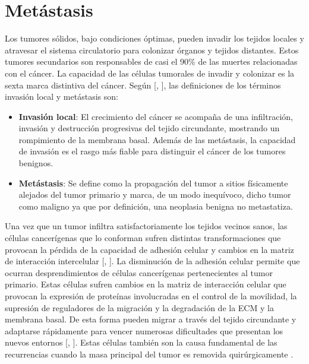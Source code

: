 \section{Metástasis}
\hspace{.1cm}Los tumores sólidos, bajo condiciones óptimas, pueden invadir los tejidos locales y atravesar el sistema circulatorio para colonizar órganos y tejidos distantes. Estos tumores secundarios son responsables de casi el 90\% de las muertes relacionadas con el cáncer. La capacidad de las células tumorales de invadir y colonizar es la sexta marca distintiva del cáncer. Según [\cite{robins}, \cite{hanahan}], las definiciones de los términos invasión local y metástasis son:
\begin{itemize}
    \item \textbf{Invasión local}: El crecimiento del cáncer se acompaña de una infiltración, invasión y destrucción progresivas del tejido circundante, mostrando un rompimiento de la membrana basal. Además de las metástasis, la capacidad de invasión es el rasgo más fiable para distinguir el cáncer de los tumores benignos.
    \item \textbf{Metástasis}: Se define como la propagación del tumor a sitios físicamente alejados del tumor primario y marca, de un modo inequívoco, dicho tumor como maligno ya que por definición, una neoplasia benigna no metastatiza.
\end{itemize}

\hspace{.1cm}Una vez que un tumor infiltra satisfactoriamente los tejidos vecinos sanos, las células cancerígenas que lo conforman sufren distintas transformaciones que provocan la pérdida de la capacidad de adhesión celular y cambios en la matriz de interacción intercelular [\cite{hanahan}, \cite{cancerbook}]. La disminución de la adhesión celular permite que ocurran desprendimientos de células cancerígenas pertenecientes al tumor primario. Estas células sufren cambios en la matriz de interacción celular que provocan la expresión de proteínas involucradas en el control de la movilidad, la supresión de reguladores de la migración y la degradación de la ECM y la membrana basal. De esta forma pueden migrar a través del tejido circundante y adaptarse rápidamente para vencer numerosas dificultades que presentan los nuevos entornos [\cite{hanahan}, \cite{cancerbook}]. Estas células también son la causa fundamental de las recurrencias cuando la masa principal del tumor es removida quirúrgicamente \cite{kansal3}.

